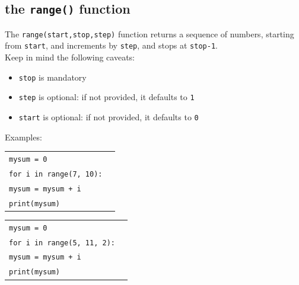 \documentclass[t,handout,9pt]{beamer}
\begin{document}
\subsection{the \texttt{range()} function}
\begin{frame}
\vfill
The \texttt{range(start,stop,step)} function returns a sequence of numbers, starting from \texttt{start}, and increments by \texttt{step}, and stops at \texttt{stop-1}.\\
Keep in mind the following caveats:
\begin{itemize}
	\item \texttt{stop} is mandatory
	\item \texttt{step} is optional: if not provided, it defaults to \texttt{1}
	\item \texttt{start} is optional: if not provided, it defaults to \texttt{0}
\end{itemize}
\vfill
Examples:
\begin{table}[]
\begin{flushleft}
\begin{tabular}{ll}
\texttt{mysum = 0} &  \\
\texttt{for i in range(7, 10):} &  \\
\texttt{\qquad mysum = mysum + i}        & \\
\texttt{print(mysum)}        & \\
\end{tabular}
\end{flushleft}
\end{table}
\begin{table}[]
\begin{flushleft}
\begin{tabular}{ll}
\texttt{mysum = 0} &  \\
\texttt{for i in range(5, 11, 2):} &  \\
\texttt{\qquad mysum = mysum + i}        & \\
\texttt{print(mysum)}        & \\
\end{tabular}
\end{flushleft}
\end{table}
\vfill
\end{frame}
%
\end{document}

